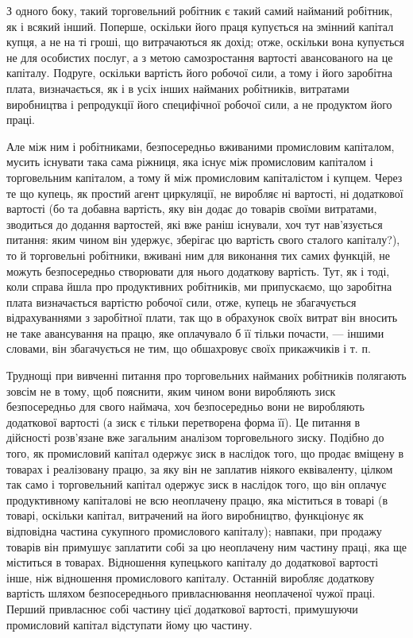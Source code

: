 
З одного боку, такий торговельний робітник є такий самий
найманий робітник, як і всякий інший. Поперше, оскільки його
праця купується на змінний капітал купця, а не на ті гроші, що
витрачаються як дохід; отже, оскільки вона купується не для
особистих послуг, а з метою самозростання вартості авансованого
на це капіталу. Подруге, оскільки вартість його робочої
сили, а тому і його заробітна плата, визначається, як і в усіх
інших найманих робітників, витратами виробництва і репродукції
його специфічної робочої сили, а не продуктом його праці.

Але між ним і робітниками, безпосередньо вживаними промисловим
капіталом, мусить існувати така сама ріжниця, яка існує
між промисловим капіталом і торговельним капіталом, а тому й
між промисловим капіталістом і купцем. Через те що купець, як
простий агент циркуляції, не виробляє ні вартості, ні додаткової
вартості (бо та добавна вартість, яку він додає до товарів своїми
витратами, зводиться до додання вартостей, які вже раніш існували,
хоч тут нав’язується питання: яким чином він удержує, зберігає
цю вартість свого сталого капіталу?), то й торговельні робітники,
вживані ним для виконання тих самих функцій, не можуть
безпосередньо створювати для нього додаткову вартість. Тут, як
і тоді, коли справа йшла про продуктивних робітників, ми припускаємо,
що заробітна плата визначається вартістю робочої сили,
отже, купець не збагачується відрахуваннями з заробітної плати,
так що в обрахунок своїх витрат він вносить не таке авансування
на працю, яке оплачувало б її тільки почасти, — іншими словами,
він збагачується не тим, що обшахровує своїх прикажчиків і т. п.

Труднощі при вивченні питання про торговельних найманих
робітників полягають зовсім не в тому, щоб пояснити, яким чином
вони виробляють зиск безпосередньо для свого наймача, хоч
безпосередньо вони не виробляють додаткової вартості (а зиск
є тільки перетворена форма її). Це питання в дійсності розв’язане
вже загальним аналізом торговельного зиску. Подібно до
того, як промисловий капітал одержує зиск в наслідок того,
що продає вміщену в товарах і реалізовану працю, за яку він
не заплатив ніякого еквіваленту, цілком так само і торговельний
капітал одержує зиск в наслідок того, що він оплачує продуктивному
капіталові не всю неоплачену працю, яка міститься
в товарі (в товарі, оскільки капітал, витрачений на його виробництво,
функціонує як відповідна частина сукупного промислового
капіталу); навпаки, при продажу товарів він примушує
заплатити собі за цю неоплачену ним частину праці, яка ще
міститься в товарах. Відношення купецького капіталу до додаткової
вартості інше, ніж відношення промислового капіталу.
Останній виробляє додаткову вартість шляхом безпосереднього
привласнювання неоплаченої чужої праці. Перший привласнює
собі частину цієї додаткової вартості, примушуючи промисловий
капітал відступати йому цю частину.

